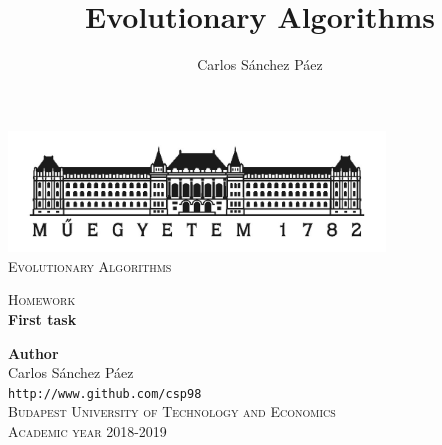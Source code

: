 \documentclass[12pt,english]{article}
\title{Evolutionary Algorithms}
\author{Carlos Sánchez Páez}
\begin{document}
\begin{titlepage}

\newlength{\centeroffset}
\setlength{\centeroffset}{-0.5\oddsidemargin}
\addtolength{\centeroffset}{0.5\evensidemargin}
\thispagestyle{empty}

\noindent\hspace*{\centeroffset}
\begin{minipage}{\textwidth}

\centering
\includegraphics[width=0.75\textwidth]{bme_logo.jpg}\\[1.4cm]

\textsc{ \Large Evolutionary Algorithms\\[4cm]}

\textsc{\Huge Homework}\\[0.75cm]

{\Large\bfseries First task\\}
\end{minipage}

\vspace{8cm}
\noindent\hspace*{\centeroffset}
\begin{minipage}{\textwidth}
\centering

\textbf{Author}\\ {Carlos Sánchez Páez}\\
\texttt{http://www.github.com/csp98}\\[0.5cm]
\textsc{Budapest University of Technology and Economics}\\
\vspace{1cm}
\textsc{Academic year 2018-2019}
\end{minipage}
\end{titlepage}
\thispagestyle{empty}

\newpage
\end{document}
